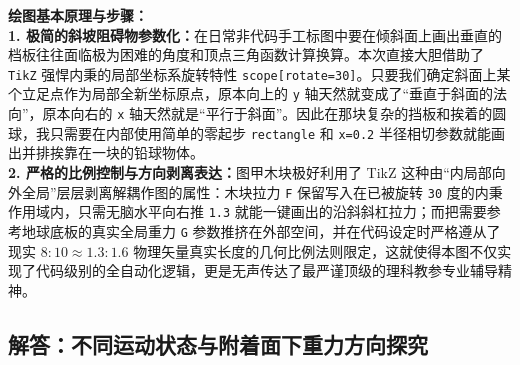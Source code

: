 {\small\color{blue!70!black}
\textbf{绘图基本原理与步骤：}\\
\textbf{1. 极简的斜坡阻碍物参数化：}在日常非代码手工标图中要在倾斜面上画出垂直的档板往往面临极为困难的角度和顶点三角函数计算换算。本次直接大胆借助了 \texttt{TikZ} 强悍内秉的局部坐标系旋转特性 \texttt{scope[rotate=30]}。只要我们确定斜面上某个立足点作为局部全新坐标原点，原本向上的 \texttt{y} 轴天然就变成了“垂直于斜面的法向”，原本向右的 \texttt{x} 轴天然就是“平行于斜面”。因此在那块复杂的挡板和挨着的圆球，我只需要在内部使用简单的零起步 \texttt{rectangle} 和 \texttt{x=0.2} 半径相切参数就能画出并排挨靠在一块的铅球物体。\\
\textbf{2. 严格的比例控制与方向剥离表达：}图甲木块极好利用了 TikZ 这种由“内局部向外全局”层层剥离解耦作图的属性：木块拉力 \texttt{F} 保留写入在已被旋转 \texttt{30} 度的内秉作用域内，只需无脑水平向右推 \texttt{1.3} 就能一键画出的沿斜斜杠拉力；而把需要参考地球底板的真实全局重力 \texttt{G} 参数推挤在外部空间，并在代码设定时严格遵从了现实 $8:10 \approx 1.3:1.6$ 物理矢量真实长度的几何比例法则限定，这就使得本图不仅实现了代码级别的全自动化逻辑，更是无声传达了最严谨顶级的理科教参专业辅导精神。
}


\newpage

\subsection{解答：不同运动状态与附着面下重力方向探究}

\vspace{0.6cm}

